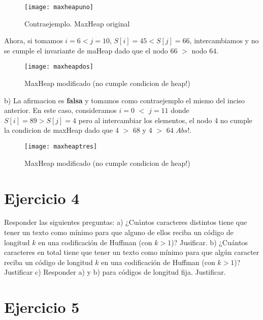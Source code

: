 \documentclass[10pt,a4paper]{article}
\begin{document}
\begin{figure}[h]
	\centering
	\texttt{[image: maxheapuno]}
	\caption{Contraejemplo. MaxHeap original}
	\label{drivers1}
\end{figure}

Ahora, si tomamos $i = 6 < j = 10$, $S[i] = 45 < S[j] = 66$, intercambiamos y no se cumple el invariante de maHeap dado que el nodo 66 $>$ nodo $64$.

\begin{figure}[h]
	\centering
	\texttt{[image: maxheapdos]}
	\caption{MaxHeap modificado (no cumple condicion de heap!)}
	\label{drivers1}
\end{figure}
\newpage

b) La afirmacion es \textbf{falsa} y tomamos como contraejemplo el mismo del inciso anterior. 
\newline
\newline
En este caso, consideramos $i = 0$ $<$ $j=11$ donde $S[i] = 89 > S[j] = 4$ pero al intercambiar los elementos, el nodo 4 no cumple la condicion de maxHeap dado que $4$ $>$ $68$ y $4$ $>$ $64$ $Abs!$.

\begin{figure}[h]
	\centering
	\texttt{[image: maxheaptres]}
	\caption{MaxHeap modificado (no cumple condicion de heap!)}
	\label{drivers1}
\end{figure}
\newpage

\section{Ejercicio 4}

Responder las siguientes preguntas:
\newline
\newline
a) ¿Cuántos caracteres distintos tiene que tener un texto como mínimo para que alguno de ellos reciba un código de longitud $k$ en una codificación de Huffman (con $k > 1$)? Jusificar.
\newline
\newline
b) ¿Cuántos caracteres en total tiene que tener un texto como mínimo para que algún caracter reciba un código de longitud $k$ en una codificación de Huffman (con $k > 1$)? Justificar
\newline
\newline
c) Responder a) y b) para códigos de longitud fija. Justificar.
\newpage

\section{Ejercicio 5}
\end{document}
